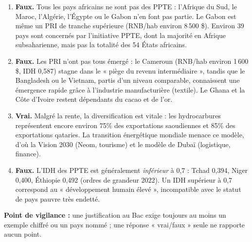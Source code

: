 \documentclass[11pt]{article}
\begin{document}
\begin{corrige}
\begin{enumerate}
\item \textbf{Faux.} Tous les pays africains ne sont pas des PPTE : l'Afrique du Sud, le Maroc, l'Algérie, l'Égypte ou le Gabon n'en font pas partie. Le Gabon est même un PRI de tranche supérieure (RNB/hab environ 8\,500 \$). Environ 39 pays sont concernés par l'initiative PPTE, dont la majorité en Afrique subsaharienne, mais pas la totalité des 54 États africains.
\item \textbf{Faux.} Les PRI n'ont pas tous émergé : le Cameroun (RNB/hab environ 1\,600 \$, IDH 0,587) stagne dans le « piège du revenu intermédiaire », tandis que le Bangladesh ou le Vietnam, partis d'un niveau comparable, connaissent une émergence rapide grâce à l'industrie manufacturière (textile). Le Ghana et la Côte d'Ivoire restent dépendants du cacao et de l'or.
\item \textbf{Vrai.} Malgré la rente, la diversification est vitale : les hydrocarbures représentent encore environ 75\% des exportations saoudiennes et 85\% des exportations qataries. La transition énergétique mondiale menace ce modèle, d'où la Vision 2030 (Neom, tourisme) et le modèle de Dubaï (logistique, finance).
\item \textbf{Faux.} L'IDH des PPTE est généralement \emph{inférieur} à 0,7 : Tchad 0,394, Niger 0,400, Éthiopie 0,492 (ordres de grandeur 2022). Un IDH supérieur à 0,7 correspond au « développement humain élevé », incompatible avec le statut de pays pauvre très endetté.
\end{enumerate}
\textbf{Point de vigilance :} une justification au Bac exige toujours au moins un exemple chiffré ou un pays nommé ; une réponse « vrai/faux » seule ne rapporte aucun point.
\end{corrige}
\end{document}
